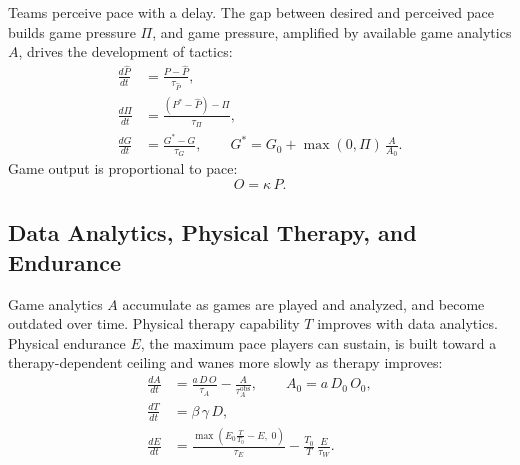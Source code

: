 Teams perceive pace with a delay. The gap between desired and
perceived pace builds game pressure $\Pi$, and game pressure, amplified
by available game analytics $A$, drives the development of tactics:
\begin{align}
  \frac{d\hat{P}}{dt} &= \frac{P - \hat{P}}{\tau_{\hat{P}}},
  \label{eq:Phat}\\[4pt]
  \frac{d\Pi}{dt} &= \frac{\left(P^{*} - \hat{P}\right) - \Pi}{\tau_{\Pi}},
  \label{eq:Pi}\\[4pt]
  \frac{dG}{dt} &= \frac{G^{*} - G}{\tau_G},
  \qquad
  G^{*} = G_0 + \max(0, \Pi)\,\frac{A}{A_0}.
  \label{eq:G}
\end{align}
Game output is proportional to pace:
\begin{equation}
  O = \kappa\, P .
  \label{eq:O}
\end{equation}


\subsection{Data Analytics, Physical Therapy, and Endurance}
\label{sec:model:body}

Game analytics $A$ accumulate as games are played and analyzed, and
become outdated over time. Physical therapy capability $T$ improves
with data analytics. Physical endurance $E$, the maximum pace players
can sustain, is built toward a therapy-dependent ceiling and wanes
more slowly as therapy improves:
\begin{align}
  \frac{dA}{dt} &= \frac{a\, D\, O}{\tau_A} - \frac{A}{\tau_A^{\mathrm{obs}}},
  \qquad A_0 = a\, D_0\, O_0,
  \label{eq:A}\\[4pt]
  \frac{dT}{dt} &= \beta\, \gamma\, D,
  \label{eq:T}\\[4pt]
  \frac{dE}{dt} &= \frac{\max\left( E_0 \frac{T}{T_0} - E,\; 0 \right)}{\tau_E}
                 - \frac{T_0}{T}\,\frac{E}{\tau_W}.
  \label{eq:E}
\end{align}


